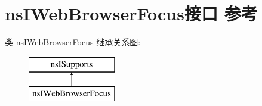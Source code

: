 \hypertarget{interfacens_i_web_browser_focus}{}\section{ns\+I\+Web\+Browser\+Focus接口 参考}
\label{interfacens_i_web_browser_focus}
类 ns\+I\+Web\+Browser\+Focus 继承关系图\+:\begin{figure}[H]
\begin{center}
\leavevmode
\includegraphics[height=2.000000cm]{interfacens_i_web_browser_focus}
\end{center}
\end{figure}
